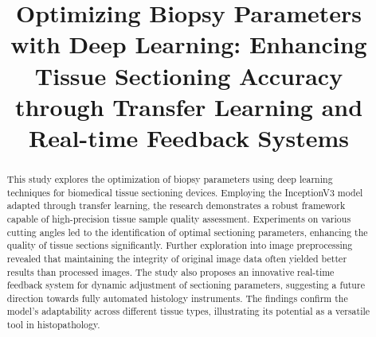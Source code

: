 \documentclass[withoutpreface,bwprint]{cumcmthesis}
\title{Optimizing Biopsy Parameters with Deep Learning: Enhancing Tissue Sectioning Accuracy through Transfer Learning and Real-time Feedback Systems}
\begin{document}
 \maketitle
\renewcommand{\abstractname}{Abstract}
\renewcommand{\keywords}{\textbf{Keywords：}}
\begin{abstract}
\begin{spacing}{1.15}

	This study explores the optimization of biopsy parameters using deep learning techniques for biomedical tissue sectioning devices. Employing the InceptionV3 model adapted through transfer learning, the research demonstrates a robust framework capable of high-precision tissue sample quality assessment. Experiments on various cutting angles led to the identification of optimal sectioning parameters, enhancing the quality of tissue sections significantly. Further exploration into image preprocessing revealed that maintaining the integrity of original image data often yielded better results than processed images. The study also proposes an innovative real-time feedback system for dynamic adjustment of sectioning parameters, suggesting a future direction towards fully automated histology instruments. The findings confirm the model’s adaptability across different tissue types, illustrating its potential as a versatile tool in histopathology.



\end{spacing}
\large

\end{abstract}




\newpage
{
	\tableofcontents
}
\newpage
\end{document}
